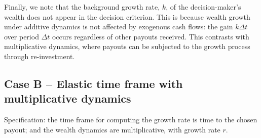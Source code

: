 \documentclass[11pt]{article}
\newcommand{\be}{\begin{equation}}
\newcommand{\ee}{\end{equation}}
\newcommand{\Dt}{\Delta t}
\newcommand{\Dx}{\Delta x}
\newcommand{\Epsilon}{\mathcal{E}}
\numberwithin{equation}{section}
\begin{document}
%
%
%
%

Finally, we note that the background growth rate, $k$, of the decision-maker's wealth does not appear in the decision criterion. This is because wealth growth under additive dynamics is not affected by exogenous cash flows: the gain $k\Dt$ over period $\Dt$ occurs regardless of other payouts received. This contrasts with multiplicative dynamics, where payouts can be subjected to the growth process through re-investment.

\subsection{Case B -- Elastic time frame with multiplicative dynamics}\label{sec:case_B}

Specification: the time frame for computing the growth rate is time to the chosen payout; and the wealth dynamics are multiplicative, with growth rate $r$.
\end{document}
